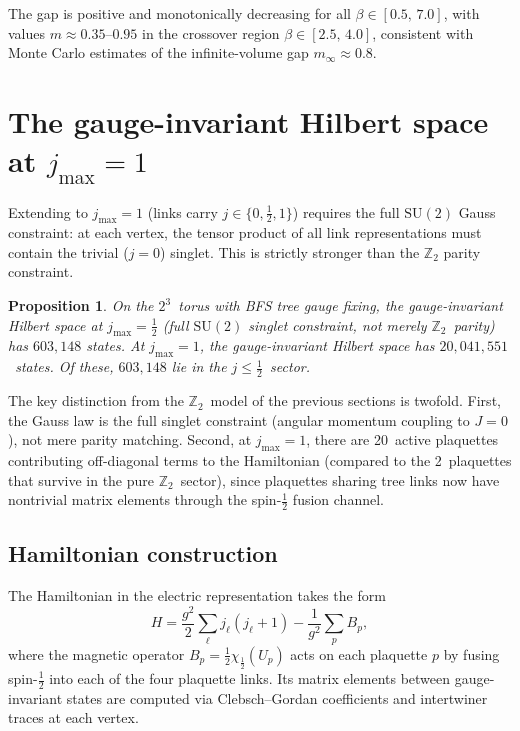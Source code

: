 \documentclass[12pt,a4paper]{article}
\newtheorem{proposition}[theorem]{Proposition}
\newcommand{\Z}{\mathbb{Z}}
\newcommand{\half}{\tfrac{1}{2}}
\begin{document}
The gap is positive and monotonically decreasing for all $\beta\in[0.5,\,7.0]$, with values $m\approx 0.35$--$0.95$ in the crossover region $\beta\in[2.5,\,4.0]$, consistent with Monte Carlo estimates of the infinite-volume gap $m_\infty\approx 0.8$.

\section{The gauge-invariant Hilbert space at $j_{\max}=1$}\label{sec:j1}

Extending to $j_{\max}=1$ (links carry $j\in\{0,\half,1\}$) requires the full $\mathrm{SU}(2)$ Gauss constraint: at each vertex, the tensor product of all link representations must contain the trivial ($j=0$) singlet. This is strictly stronger than the $\Z_2$ parity constraint.

\begin{proposition}\label{prop:j1dim}
On the $2^3$~torus with BFS tree gauge fixing, the gauge-invariant Hilbert space at $j_{\max}=\half$ (full $\mathrm{SU}(2)$ singlet constraint, not merely $\Z_2$~parity) has $603{,}148$ states.  At $j_{\max}=1$, the gauge-invariant Hilbert space has $20{,}041{,}551$~states. Of these, $603{,}148$ lie in the $j\le\half$~sector.
\end{proposition}

The key distinction from the $\Z_2$~model of the previous sections is twofold. First, the Gauss law is the full singlet constraint (angular momentum coupling to $J=0$), not mere parity matching. Second, at $j_{\max}=1$, there are 20~active plaquettes contributing off-diagonal terms to the Hamiltonian (compared to the 2~plaquettes that survive in the pure $\Z_2$~sector), since plaquettes sharing tree links now have nontrivial matrix elements through the spin-$\half$ fusion channel.

\subsection{Hamiltonian construction}

The Hamiltonian in the electric representation takes the form
\begin{equation}\label{eq:H_SU2}
H = \frac{g^2}{2}\sum_{\ell} j_\ell(j_\ell+1) - \frac{1}{g^2}\sum_{p} B_p,
\end{equation}
where the magnetic operator $B_p = \half\chi_\half(U_p)$ acts on each plaquette $p$ by fusing spin-$\half$ into each of the four plaquette links. Its matrix elements between gauge-invariant states are computed via Clebsch--Gordan coefficients and intertwiner traces at each vertex.
\end{document}
